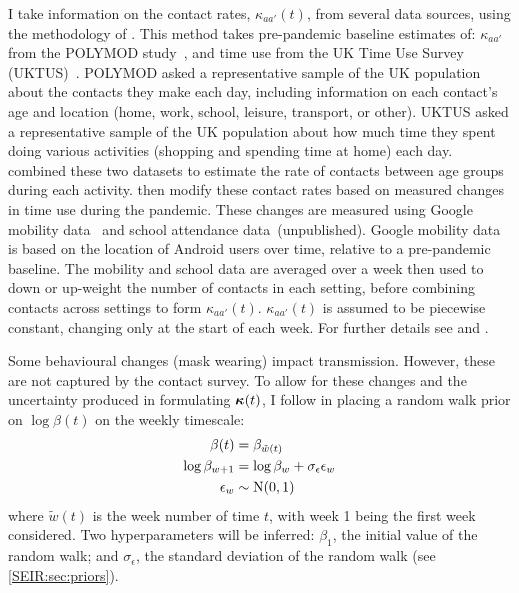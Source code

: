\documentclass[thesis.tex]{subfiles}
\begin{document}
I take information on the contact rates, $\kappa_{aa'}(t)$, from several data sources, using the methodology of \textcites{vanleeuwenTime}{vanleeuwenAugmenting}.
This method takes pre-pandemic baseline estimates of: $\kappa_{aa'}$ from the POLYMOD study~\autocite{mossongSocial}, and time use from the UK Time Use Survey (UKTUS)~\autocite{UKTUS}.
POLYMOD asked a representative sample of the UK population about the contacts they make each day, including information on each contact's age and location (home, work, school, leisure, transport, or other).
UKTUS asked a representative sample of the UK population about how much time they spent doing various activities (\eg shopping and spending time at home) each day.
\Textcite{vanleeuwenAugmenting} combined these two datasets to estimate the rate of contacts between age groups during each activity.
\Textcite{birrellRealtime} then modify these contact rates based on measured changes in time use during the pandemic.
These changes are measured using Google mobility data~\autocite{googleCOVID19} and school attendance data~(unpublished).
Google mobility data is based on the location of Android users over time, relative to a pre-pandemic baseline.
The mobility and school data are averaged over a week then used to down or up-weight the number of contacts in each setting, before combining contacts across settings to form $\kappa_{aa'}(t)$.
$\kappa_{aa'}(t)$ is assumed to be piecewise constant, changing only at the start of each week.
For further details see \textcite{vanleeuwenAugmenting} and \textcite[supplementary material]{birrellRealtime}.

Some behavioural changes (\eg mask wearing) impact transmission.
However, these are not captured by the contact survey.
To allow for these changes and the uncertainty produced in formulating $\bm{\kappa}(t)$, I follow \textcite{birrellRealtime} in placing a random walk prior on $\log\beta(t)$  on the weekly timescale:
\begin{align}
    \beta(t) &= \beta_{\tilde{w}(t)} \\
    \log\beta_{w+1} &= \log\beta_w + \sigma_\epsilon \epsilon_w \\
    \epsilon_w &\sim \operatorname{N}(0, 1)
\end{align}
where $\tilde{w}(t)$ is the week number of time $t$, with week 1 being the first week considered.
Two hyperparameters will be inferred: $\beta_1$, the initial value of the random walk; and $\sigma_\epsilon$, the standard deviation of the random walk (see \cref{SEIR:sec:priors}).
\end{document}
